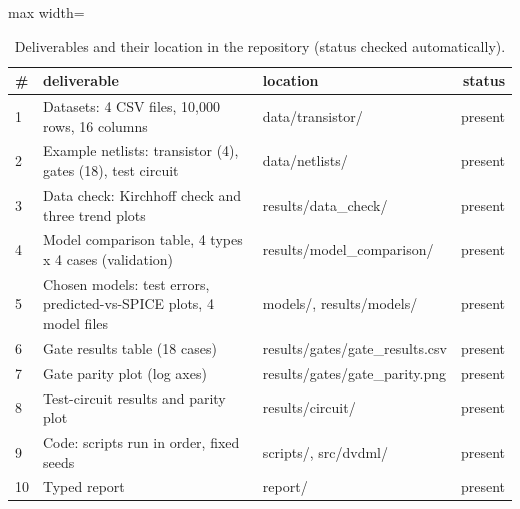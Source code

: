 \begin{table}[H]
\centering
{\small
\begin{adjustbox}{max width=\linewidth}
\begin{tabular}{lllr}
\toprule
\# & deliverable & location & status \\
\midrule
1 & Datasets: 4 CSV files, 10,000 rows, 16 columns & data/transistor/ & present \\
2 & Example netlists: transistor (4), gates (18), test circuit & data/netlists/ & present \\
3 & Data check: Kirchhoff check and three trend plots & results/data\_check/ & present \\
4 & Model comparison table, 4 types x 4 cases (validation) & results/model\_comparison/ & present \\
5 & Chosen models: test errors, predicted-vs-SPICE plots, 4 model files & models/, results/models/ & present \\
6 & Gate results table (18 cases) & results/gates/gate\_results.csv & present \\
7 & Gate parity plot (log axes) & results/gates/gate\_parity.png & present \\
8 & Test-circuit results and parity plot & results/circuit/ & present \\
9 & Code: scripts run in order, fixed seeds & scripts/, src/dvdml/ & present \\
10 & Typed report & report/ & present \\
\bottomrule
\end{tabular}
\end{adjustbox}
}
\caption{Deliverables and their location in the repository (status checked automatically).}
\label{tab:deliv}
\end{table}

